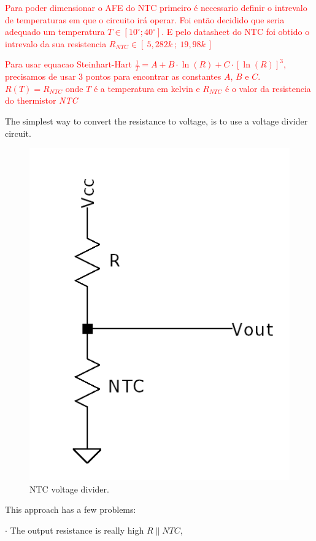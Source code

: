 \documentclass[12pt]{article}
\begin{document}
    \textcolor{red}{ Para poder dimensionar o AFE do NTC primeiro é necessario definir o intrevalo de temperaturas em que o circuito irá operar.
    Foi então decidido que seria adequado um temperatura $T \in [ 10^{\circ}; 40^{\circ} ]$.
    E pelo datasheet do NTC foi obtido o intrevalo da sua resistencia $R_{NTC} \in [~5,282k~;~19,98k~]$}

    \textcolor{red}{Para usar equacao Steinhart-Hart $\frac{1}{T} = A + B\cdot \ln(R) + C\cdot [\ln(R)]^3$, precisamos de usar 3 pontos para encontrar as constantes $A$, $B$ e $C$.
    ~
    $R(T) = R_{NTC} $ onde $T$ é a temperatura em kelvin e $R_{NTC}$ é o valor da resistencia do thermistor \textit{NTC}
    }

    The simplest way to convert the resistance to voltage, is to use a voltage divider circuit.


   \begin{figure}[H] 
        \centering
        \includegraphics*[scale = 0.25]{images/voltagedivider.png}
        \caption{NTC voltage divider.}
        \label{wrap-fig:1}
    \end{figure}

    This approach  has a few problems: 

    $\cdot$ The output resistance is really high $R\parallel NTC$, 
\end{document}
